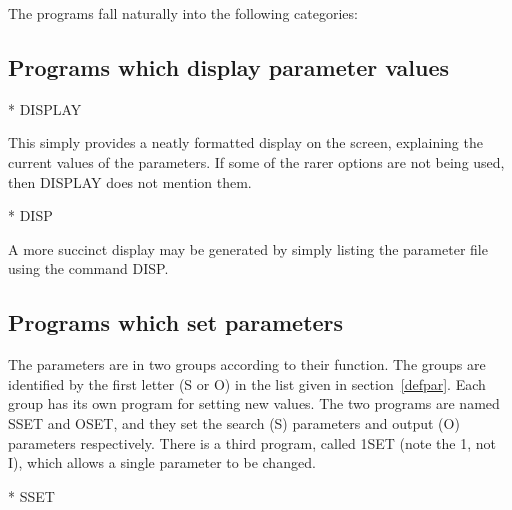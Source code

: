\documentclass{article}
\begin{document}
The programs fall naturally into the following categories:
\subsection{Programs which display parameter values}
* DISPLAY

This simply provides a neatly formatted display on the screen, explaining the
current values of the parameters.
If some of the rarer options are not being used, then DISPLAY does not mention
them.

* DISP

A more succinct display may be generated by simply listing the parameter file
using the command DISP.
\subsection{Programs which set parameters}
\label{setpar}
The parameters are in two groups according to their function.
The groups are identified by the first letter (S or O) in the list given in
section~\ref{defpar}.
Each group has its own program for setting new values.
The two programs are named SSET and OSET, and they set the search (S) parameters
and output (O) parameters respectively.
There is a third program, called 1SET (note the 1, not I), which allows a
single parameter to be changed.

* SSET
\end{document}
